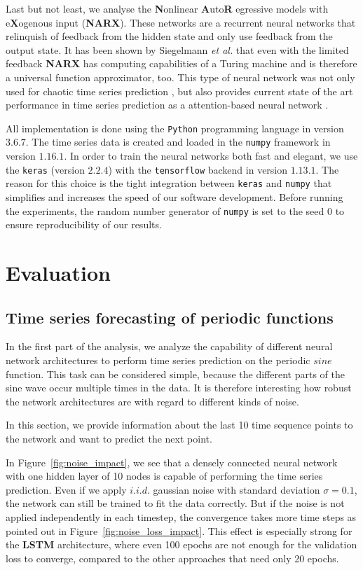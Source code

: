 \documentclass{article}
\begin{document}
Last but not least, we analyse the \textbf{N}onlinear \textbf{A}uto\textbf{R}
egressive models with e\textbf{X}ogenous input (\textbf{NARX}).
These networks are a recurrent
neural networks that relinquish of feedback from the hidden state and only use
feedback from the output state. It has been shown by Siegelmann \textit{et al.}
that even with the limited feedback \textbf{NARX} has computing capabilities of
a Turing machine \cite{siegelmann1997} and is therefore a universal function
approximator, too. This type of neural network was not only used for chaotic
time series prediction \cite{diaconescu2008}, but also provides current
state of the art performance in time series prediction as a attention-based
neural network \cite{qin2017}. 

All implementation is done using the \texttt{Python} programming language in
version $3.6.7$. The time series data is created and loaded in the
\texttt{numpy} framework in version $1.16.1$. In order to train the neural
networks both fast and elegant, we use the \texttt{keras} (version $2.2.4$)
with the
\texttt{tensorflow} backend in version $1.13.1$.
The reason for this choice is the tight
integration between \texttt{keras} and \texttt{numpy} that simplifies and
increases the speed of our software development. Before running the experiments,
the random number generator of \texttt{numpy} is set to the seed $0$ to ensure
reproducibility of our results.

\section{Evaluation} 
\subsection{Time series forecasting of periodic functions}
\label{sec:sine} 
In the first part of the analysis, we analyze the capability of different neural
network architectures to perform time series prediction on the periodic $sine$
function. This task can be considered simple, because the different parts of the
sine wave occur multiple times in the data. It is therefore interesting how
robust the network architectures are with regard to different kinds of noise.

In this section, we provide information about the last 10 time sequence points
to the network and want to predict the next point.

In Figure~\ref{fig:noise_impact}, we see that a densely connected neural network
with one hidden layer of 10 nodes is capable of performing the time series
prediction. Even if we apply $i.i.d.$ gaussian noise with standard
deviation $\sigma = 0.1$, the
network can still be trained to fit the data correctly. But if the noise is not
applied independently in each timestep, the convergence takes more time steps as
pointed out in Figure~\ref{fig:noise_loss_impact}. This effect is especially 
strong for the \textbf{LSTM} architecture, where even 100 epochs are not enough
for the validation loss to converge, compared to the other approaches that need
only 20 epochs.
\end{document}
